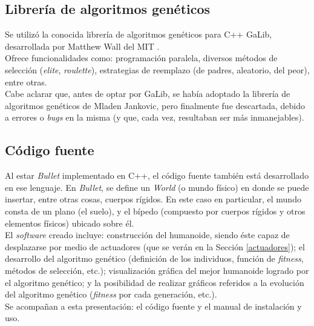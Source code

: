 \documentclass{article}
\begin{document}
\subsection{Librer\'ia de algoritmos gen\'eticos}

Se utiliz\'o la conocida librer\'ia de algoritmos gen\'eticos para C++ GaLib, desarrollada por Matthew Wall del MIT \cite{LinkGaLib}. \\
Ofrece funcionalidades como: programaci\'on paralela, diversos m\'etodos de selecci\'on (\textit{elite}, \textit{roulette}), estrategias de reemplazo (de padres, aleatorio, del peor), entre otras.\\
Cabe aclarar que, antes de optar por GaLib, se hab\'ia adoptado la librer\'ia de algoritmos gen\'eticos de Mladen Jankovic, pero finalmente fue descartada, debido a errores o \textit{bugs} en la misma (y que, cada vez, resultaban ser m\'as inmanejables).


\subsection{C\'odigo fuente}

Al estar \textit{Bullet} implementado en C++, el c\'odigo fuente tambi\'en est\'a desarrollado en ese lenguaje. En \textit{Bullet}, se define un \textit{World} (o mundo f\'isico) en donde se puede insertar, entre otras cosas, cuerpos r\'igidos. En este caso en particular, el mundo consta de un plano  (el suelo), y  el b\'ipedo (compuesto por cuerpos r\'igidos y otros elementos f\'isicos) ubicado sobre \'el. \\
El \textit{software} creado incluye: construcci\'on del humanoide, siendo \'este capaz de desplazarse por medio de actuadores (que se ver\'an en la Secci\'on \ref{actuadores}); el desarrollo del algoritmo gen\'etico (definici\'on de los individuos, funci\'on de \textit{fitness}, m\'etodos de selecci\'on, etc.); visualizaci\'on gr\'afica del mejor humanoide logrado por el algoritmo gen\'etico; y la posibilidad de realizar gr\'aficos referidos a la evoluci\'on del algoritmo gen\'etico (\textit{fitness} por cada generaci\'on, etc.). \\
Se acompa\~nan a esta presentaci\'on: el c\'odigo fuente y el manual de instalaci\'on y uso.
\end{document}
